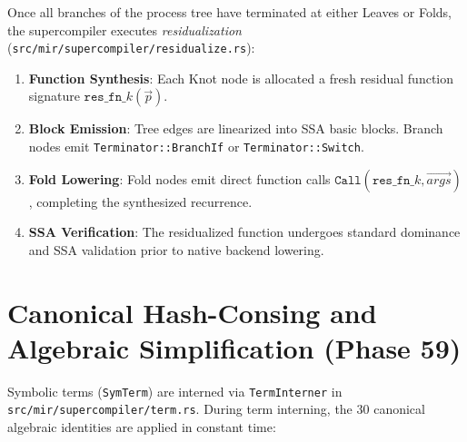 Once all branches of the process tree have terminated at either Leaves or Folds, the supercompiler executes \emph{residualization} (\texttt{src/mir/supercompiler/residualize.rs}):

\begin{enumerate}
    \item \textbf{Function Synthesis}: Each Knot node is allocated a fresh residual function signature $\mathtt{res\_fn\_}k(\vec{p})$.
    \item \textbf{Block Emission}: Tree edges are linearized into SSA basic blocks. Branch nodes emit \texttt{Terminator::BranchIf} or \texttt{Terminator::Switch}.
    \item \textbf{Fold Lowering}: Fold nodes emit direct function calls $\mathtt{Call}(\mathtt{res\_fn\_}k, \vec{args})$, completing the synthesized recurrence.
    \item \textbf{SSA Verification}: The residualized function undergoes standard dominance and SSA validation prior to native backend lowering.
\end{enumerate}

\section{Canonical Hash-Consing and Algebraic Simplification (Phase 59)}
\label{sec:state:algebraic_impl}

Symbolic terms (\texttt{SymTerm}) are interned via \texttt{TermInterner} in \texttt{src/mir/supercompiler/term.rs}. During term interning, the 30 canonical algebraic identities are applied in constant time:

